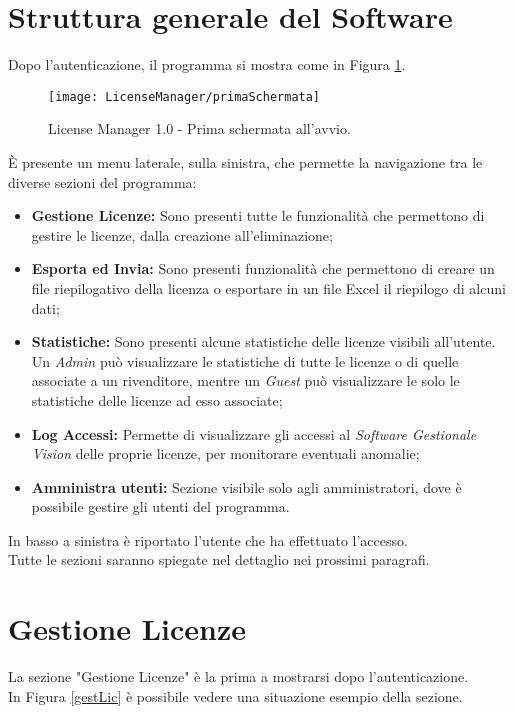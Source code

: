 \section{Struttura generale del Software}
Dopo l'autenticazione, il programma si mostra come in Figura \ref{primscher}.

\begin{figure}[!h] 
    \centering 
    \texttt{[image: LicenseManager/primaSchermata]} 
    \caption{License Manager 1.0 - Prima schermata all'avvio.}
    \label{primscher}
\end{figure}

È presente un menu laterale, sulla sinistra, che permette la navigazione tra le diverse sezioni del programma:

\begin{itemize}
\item \textbf{Gestione Licenze:} Sono presenti tutte le funzionalità che permettono di gestire le licenze, dalla creazione all’eliminazione;
\item \textbf{Esporta ed Invia:} Sono presenti funzionalità che permettono di creare un file riepilogativo della licenza o esportare in un file Excel il riepilogo di alcuni dati;
\item \textbf{Statistiche:} Sono presenti alcune statistiche delle licenze visibili all’utente. Un \textit{Admin} può visualizzare le statistiche di tutte le licenze o di quelle associate a un rivenditore, mentre un \textit{Guest} può visualizzare le solo le statistiche delle licenze ad esso associate;
\item \textbf{Log Accessi:} Permette di visualizzare gli accessi al \textit{Software Gestionale Vision} delle proprie licenze, per monitorare eventuali anomalie;
\item \textbf{Amministra utenti:} Sezione visibile solo agli amministratori, dove è possibile gestire gli utenti del programma.

\end{itemize}

In basso a sinistra è riportato l’utente che ha effettuato l'accesso.
\\
Tutte le sezioni saranno spiegate nel dettaglio nei prossimi paragrafi.

\newpage
\section{Gestione Licenze}
La sezione "Gestione Licenze" è la prima a mostrarsi dopo l'autenticazione. \\ In Figura \ref{gestLic} è possibile vedere una situazione esempio della sezione.

